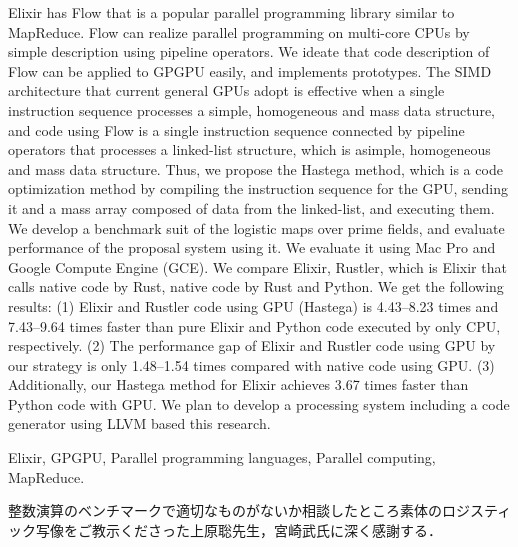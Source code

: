\documentclass[submit,PRO]{ipsj}
\begin{document}
\begin{eabstract}
Elixir has Flow that is a popular parallel programming library similar to MapReduce. Flow can realize parallel programming on multi-core CPUs by simple description using pipeline operators. We ideate that code description of Flow can be applied to GPGPU easily, and implements prototypes. The SIMD architecture that current general GPUs adopt is effective when a single instruction sequence processes a simple, homogeneous and mass data structure, and code using Flow is a single instruction sequence connected by pipeline operators that processes a linked-list structure, which is asimple, homogeneous and mass data structure. Thus, we propose the Hastega method, which is a code optimization method by compiling the instruction sequence for the GPU, sending it and a mass array composed of data from the linked-list, and executing them. We develop a benchmark suit of the logistic maps over prime fields, and evaluate performance of the proposal system using it. We evaluate it using Mac Pro and Google Compute Engine (GCE). We compare Elixir, Rustler, which is Elixir that calls native code by Rust, native code by Rust and Python. We get the following results: (1) Elixir and Rustler code using GPU (Hastega) is 4.43--8.23 times and 7.43--9.64 times faster than pure Elixir and Python code executed by only CPU, respectively. (2) The performance gap of Elixir and Rustler code using GPU by our strategy is only 1.48--1.54 times compared with native code using GPU. (3) Additionally, our Hastega method for Elixir achieves 3.67 times faster than Python code with GPU. We plan to develop a processing system including a code generator using LLVM based this research.
\end{eabstract}

\begin{ekeyword}
Elixir, GPGPU, Parallel programming languages, Parallel computing, MapReduce.
\end{ekeyword}

\maketitle



\begin{acknowledgment}
整数演算のベンチマークで適切なものがないか相談したところ素体のロジスティック写像\cite{Miyazaki14}をご教示くださった上原聡先生，宮崎武氏に深く感謝する．
\end{acknowledgment}




\end{document}
